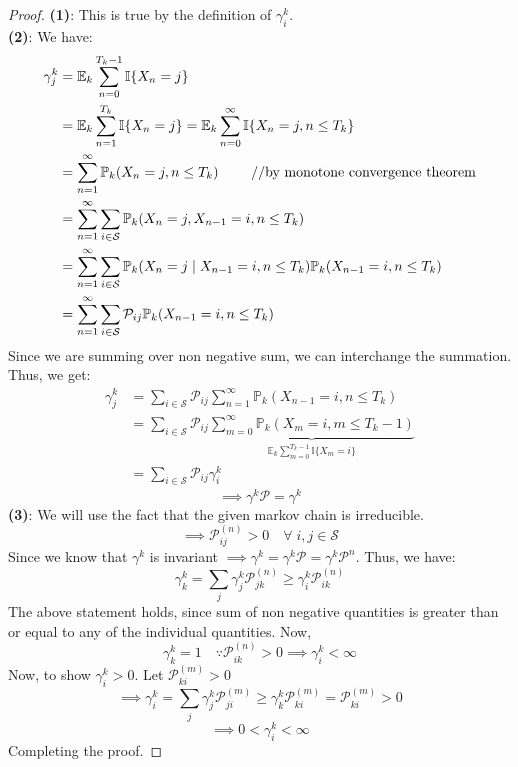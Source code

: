 \begin{proof}
    \textbf{(1)}: This is true by the definition of \(\gamma _i^k\).\\
    \textbf{(2)}: We have:
    \[
        \begin{aligned}
            \gamma _j^k &= \mathbb{E}_k  \sum_{n=0}^{T_k - 1} \mathbb{I} \{X_n = j\}\\
            & = \mathbb{E}_k  \sum_{n=1}^{T_k} \mathbb{I} \{X_n = j\} = 
            \mathbb{E}_k  \sum_{n=0}^{\infty } \mathbb{I} \{X_n = j, n \leq T_k\} \\
            & = \sum_{n=1}^{\infty} \mathbb{P}_k (X_n = j, n \leq T_k) \hfill \qquad \text{ //by monotone convergence theorem} \\
            & = \sum_{n=1}^{\infty} \sum_{i \in \mathcal{S}} \mathbb{P}_k (X_n = j, X_{n-1} = i, n \leq T_k) \\
            & = \sum_{n=1}^{\infty} \sum_{i \in \mathcal{S}} \mathbb{P}_k (X_n = j \mid 
            X_{n-1} = i, n \leq T_k) \mathbb{P}_k (X_{n-1} = i, n \leq T_k) \\ 
            & = \sum_{n=1}^{\infty} \sum_{i \in \mathcal{S}} \mathcal{P}_{ij} \mathbb{P}_k (X_{n-1} = i, n \leq T_k) \\
        \end{aligned}
    \]
    Since we are summing over non negative sum, we can interchange the summation. Thus, we get:
    \[
        \begin{aligned}
            \gamma _j^k &= \sum_{i \in \mathcal{S}} \mathcal{P}_{ij} \sum_{n=1}^{\infty} \mathbb{P}_k (X_{n-1} = i, n \leq T_k) \\
            & = \sum_{i \in \mathcal{S}} \mathcal{P}_{ij} 
            \underbrace{\sum_{m=0}^{\infty}\mathbb{P}_k (X_m = i , m \leq T_k - 1)}_
            {\mathbb{E}_k \sum\limits_{m=0}^{T_k - 1} \mathbb{I} \{X_m = i\}} \\
            & = \sum_{i \in \mathcal{S}} \mathcal{P}_{ij} \gamma _i^k
        \end{aligned}
    \]
    \[
        \implies  \gamma ^k \mathcal{P} = \gamma ^k
    \]
    \textbf{(3)}: We will use the fact that the given markov chain is irreducible.
    \[
        \implies \mathcal{P}_{ij}^{(n)} > 0 \quad \forall \; i,j \in \mathcal{S}  
    \]
    Since we know that \(\gamma ^k\) is invariant \(\implies \gamma ^k = \gamma ^k \mathcal{P} = \gamma ^k \mathcal{P}^n\).
    Thus, we have:
    \[
        \gamma ^k_k = \sum_j \gamma _j^{k}\mathcal{P}_{jk}^{(n)} \geq \gamma _i^k \mathcal{P}_{ik}^{(n)}
    \]
    The above statement holds, since sum of non negative quantities is greater than or equal to any of the 
    individual quantities.
    Now,
    \[
        \gamma _k^k = 1 \quad \because \mathcal{P}_{ik}^{(n)} > 0 \implies \gamma _i^k < \infty  
    \]
    Now, to show \(\gamma _i^k > 0\). Let \(\mathcal{P}_{ki}^{(m)} > 0 \)
    \[
        \implies  \gamma _i^k = \sum_j \gamma _j^k \mathcal{P}_{ji}^{(m)} \geq \gamma _k^k \mathcal{P}_{ki}^{(m)}
        = \mathcal{P}_{ki}^{(m)} > 0
    \]
    \[
        \implies 0 < \gamma _i^k < \infty  
    \]
    Completing the proof.
\end{proof}
